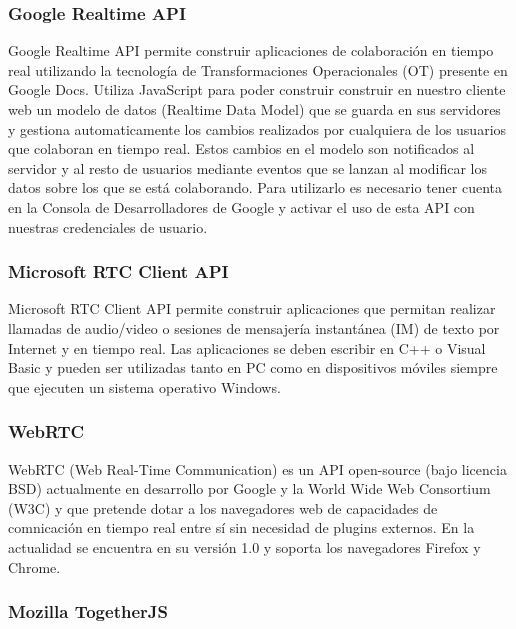 	\subsubsection{Google Realtime API}\label{sssec:googleAPI}
	
	Google Realtime API \cite{ref:google_api} permite construir aplicaciones de colaboración en tiempo real utilizando la tecnología de Transformaciones Operacionales (OT) presente en Google Docs. Utiliza JavaScript para poder construir construir en nuestro cliente web un modelo de datos (Realtime Data Model) que se guarda en sus servidores y gestiona automaticamente los cambios realizados por cualquiera de los usuarios que colaboran en tiempo real. Estos cambios en el modelo son notificados al servidor y al resto de usuarios mediante eventos que se lanzan al modificar los datos sobre los que se está colaborando. Para utilizarlo es necesario tener cuenta en la Consola de Desarrolladores de Google y activar el uso de esta API con nuestras credenciales de usuario.
	
	\subsubsection{Microsoft RTC Client API}
	
	Microsoft RTC Client API	 \cite{ref:microsoft_api} permite construir aplicaciones que permitan realizar llamadas de audio/video o sesiones de mensajería instantánea (IM) de texto por Internet y en tiempo real. Las aplicaciones se deben escribir en C++ o Visual Basic y pueden ser utilizadas tanto en PC como en dispositivos móviles siempre que ejecuten un sistema operativo Windows.
	
	\subsubsection{WebRTC}
	
	WebRTC \cite{ref:webRTC} (Web Real-Time Communication) es un API open-source (bajo licencia BSD) actualmente en desarrollo por Google y la World Wide Web Consortium (W3C) y que pretende dotar a los navegadores web de capacidades de comnicación en tiempo real entre sí sin necesidad de plugins externos. En la actualidad se encuentra en su versión 1.0 y soporta los navegadores Firefox y Chrome. 
	
	
	\subsubsection{Mozilla TogetherJS}

